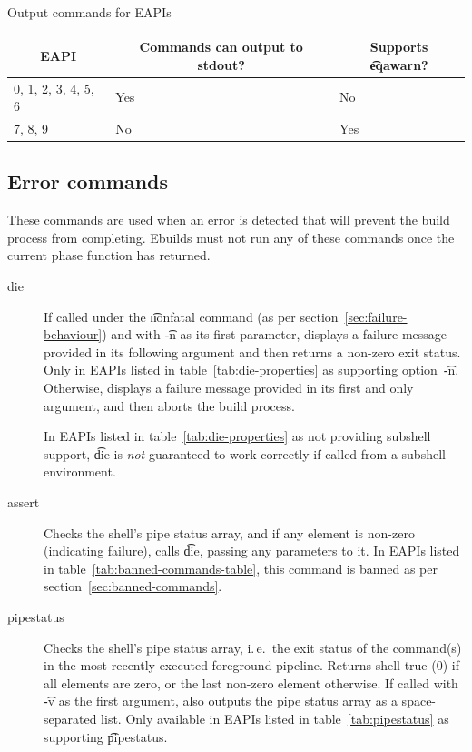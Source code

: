 \begin{centertable}{Output commands for EAPIs}
    \label{tab:output-commands}
    \begin{tabular}{lll}
      \toprule
      \multicolumn{1}{c}{\textbf{EAPI}} &
      \multicolumn{1}{c}{\textbf{Commands can output to stdout?}} &
      \multicolumn{1}{c}{\textbf{Supports \t{eqawarn}?}} \\
      \midrule
      0, 1, 2, 3, 4, 5, 6 & Yes & No  \\
      7, 8, 9             & No  & Yes \\
      \bottomrule
    \end{tabular}
\end{centertable}

\subsection{Error commands}
These commands are used when an error is detected that will prevent the build process from
completing. Ebuilds must not run any of these commands once the current phase function has returned.
\begin{description}
\item[die]  If called under the \t{nonfatal} command (as per
    section~\ref{sec:failure-behaviour}) and with \t{-n} as its first parameter, displays a failure
    message provided in its following argument and then returns a non-zero exit status. Only in
    EAPIs listed in table~\ref{tab:die-properties} as supporting option~\t{-n}. Otherwise, displays
    a failure message provided in its first and only argument, and then aborts the build process.

     In EAPIs listed in table~\ref{tab:die-properties} as not providing
    subshell support, \t{die} is \emph{not} guaranteed to work correctly if called from a subshell
    environment.
\item[assert] Checks the shell's pipe status array, and if any element is non-zero (indicating
    failure), calls \t{die}, passing any parameters to it.
    In EAPIs listed in table~\ref{tab:banned-commands-table}, this command is banned as per
    section~\ref{sec:banned-commands}.
\item[pipestatus]  Checks the shell's pipe status array, i.\,e.\ the exit
    status of the command(s) in the most recently executed foreground pipeline. Returns shell true
    (0) if all elements are zero, or the last non-zero element otherwise. If called with \t{-v}
    as the first argument, also outputs the pipe status array as a space-separated list.
    Only available in EAPIs listed in table~\ref{tab:pipestatus} as supporting \t{pipestatus}.
\end{description}

